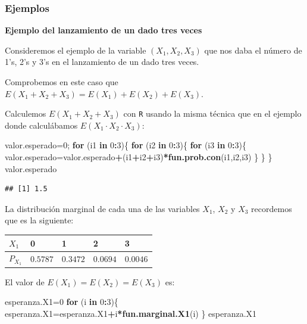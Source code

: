\documentclass[]{book}
\newenvironment{Shaded}{\begin{snugshade}}{\end{snugshade}}
\newcommand{\ControlFlowTok}[1]{\textcolor[rgb]{0.13,0.29,0.53}{\textbf{#1}}}
\newcommand{\DecValTok}[1]{\textcolor[rgb]{0.00,0.00,0.81}{#1}}
\newcommand{\KeywordTok}[1]{\textcolor[rgb]{0.13,0.29,0.53}{\textbf{#1}}}
\newcommand{\NormalTok}[1]{#1}
\newcommand{\OperatorTok}[1]{\textcolor[rgb]{0.81,0.36,0.00}{\textbf{#1}}}
\begin{document}
\hypertarget{ejemplos-13}{%
\subsubsection{Ejemplos}\label{ejemplos-13}}

\textbf{Ejemplo del lanzamiento de un dado tres veces}

Consideremos el ejemplo de la variable \((X_1,X_2,X_3)\) que nos daba el número de 1's, 2's y 3's en el lanzamiento de un dado tres veces.

Comprobemos en este caso que \(E(X_1+X_2+X_3)=E(X_1)+E(X_2)+E(X_3)\).

Calculemos \(E(X_1+X_2+X_3)\) con \texttt{R} usando la misma técnica que en el ejemplo donde calculábamos \(E(X_1\cdot X_2\cdot X_3)\):

\begin{Shaded}
\begin{Highlighting}[]
\NormalTok{valor.esperado=}\DecValTok{0}\NormalTok{;}
\ControlFlowTok{for}\NormalTok{ (i1 }\ControlFlowTok{in} \DecValTok{0}\OperatorTok{:}\DecValTok{3}\NormalTok{)\{}
  \ControlFlowTok{for}\NormalTok{ (i2 }\ControlFlowTok{in} \DecValTok{0}\OperatorTok{:}\DecValTok{3}\NormalTok{)\{}
    \ControlFlowTok{for}\NormalTok{ (i3 }\ControlFlowTok{in} \DecValTok{0}\OperatorTok{:}\DecValTok{3}\NormalTok{)\{}
\NormalTok{      valor.esperado=valor.esperado}\OperatorTok{+}\NormalTok{(i1}\OperatorTok{+}\NormalTok{i2}\OperatorTok{+}\NormalTok{i3)}\OperatorTok{*}\KeywordTok{fun.prob.con}\NormalTok{(i1,i2,i3)}
\NormalTok{    \}}
\NormalTok{  \}}
\NormalTok{\}}
\NormalTok{valor.esperado}
\end{Highlighting}
\end{Shaded}

\begin{verbatim}
## [1] 1.5
\end{verbatim}

La distribución marginal de cada una de las variables \(X_1\), \(X_2\) y \(X_3\) recordemos que es la siguiente:

\begin{longtable}[]{@{}lllll@{}}
\toprule
\(X_1\) & 0 & 1 & 2 & 3\tabularnewline
\midrule
\endhead
\(P_{X_1}\) & \(0.5787\) & \(0.3472\) & \(0.0694\) & \(0.0046\)\tabularnewline
\bottomrule
\end{longtable}

El valor de \(E(X_1)=E(X_2)=E(X_3)\) es:

\begin{Shaded}
\begin{Highlighting}[]
\NormalTok{esperanza.X1=}\DecValTok{0}
\ControlFlowTok{for}\NormalTok{ (i }\ControlFlowTok{in} \DecValTok{0}\OperatorTok{:}\DecValTok{3}\NormalTok{)\{}
\NormalTok{  esperanza.X1=esperanza.X1}\OperatorTok{+}\NormalTok{i}\OperatorTok{*}\KeywordTok{fun.marginal.X1}\NormalTok{(i)}
\NormalTok{\}}
\NormalTok{esperanza.X1}
\end{Highlighting}
\end{Shaded}
\end{document}
